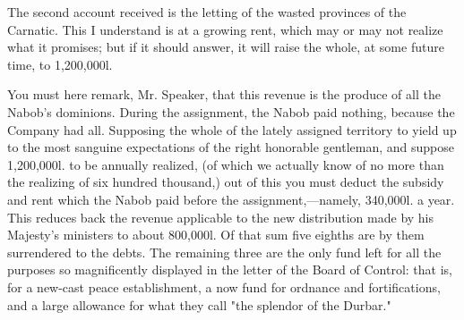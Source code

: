 The second account received is the letting of the wasted provinces of the Carnatic. This I understand is at a growing rent, which may or may not realize what it promises; but if it should answer, it will raise the whole, at some future time, to 1,200,000l.

You must here remark, Mr. Speaker, that this revenue is the produce of all the Nabob's dominions. During the assignment, the Nabob paid nothing, because the Company had all. Supposing the whole of the lately assigned territory to yield up to the most sanguine expectations of the right honorable gentleman, and suppose 1,200,000l. to be annually realized, (of which we actually know of no more than the realizing of six hundred thousand,) out of this you must deduct the subsidy and rent which the Nabob paid before the assignment,—namely, 340,000l. a year. This reduces back the revenue applicable to the new distribution made by his Majesty's ministers to about 800,000l. Of that sum five eighths are by them surrendered to the debts. The remaining three are the only fund left for all the purposes so magnificently displayed in the letter of the Board of Control: that is, for a new-cast peace establishment, a now fund for ordnance and fortifications, and a large allowance for what they call "the splendor of the Durbar."

